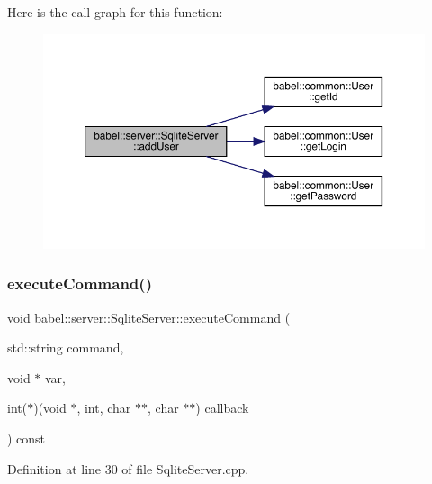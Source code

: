 Here is the call graph for this function\+:\nopagebreak
\begin{figure}[H]
\begin{center}
\leavevmode
\includegraphics[width=350pt]{classbabel_1_1server_1_1_sqlite_server_a699fb4106518510a5105616704eca892_cgraph}
\end{center}
\end{figure}
\mbox{\label{classbabel_1_1server_1_1_sqlite_server_abb0cc14be5f51826b9165e14ce83e0d0}} 
\subsubsection{\texorpdfstring{execute\+Command()}{executeCommand()}}
{\footnotesize\ttfamily void babel\+::server\+::\+Sqlite\+Server\+::execute\+Command (\begin{DoxyParamCaption}\item[{std\+::string}]{command,  }\item[{void $\ast$}]{var,  }\item[{int($\ast$)(void $\ast$, int, char $\ast$$\ast$, char $\ast$$\ast$)}]{callback }\end{DoxyParamCaption}) const}



Definition at line 30 of file Sqlite\+Server.\+cpp.

